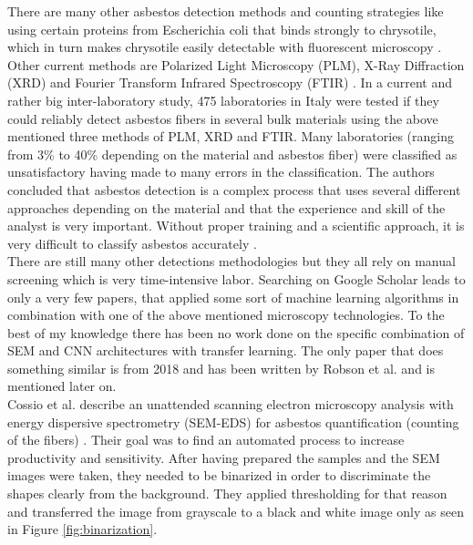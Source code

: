 There are many other asbestos detection methods and counting strategies like using certain proteins from Escherichia coli that binds strongly to chrysotile, which in turn makes chrysotile easily detectable with fluorescent microscopy \cite{kuroda2008detection}. Other current methods are Polarized Light Microscopy (PLM), X-Ray Diffraction (XRD) and Fourier Transform Infrared Spectroscopy (FTIR) \cite{campopiano2018inter}. In a current and rather big inter-laboratory study, 475 laboratories in Italy were tested if they could reliably detect asbestos fibers in several bulk materials using the above mentioned three methods of PLM, XRD and FTIR. Many laboratories (ranging from 3\% to 40\% depending on the material and asbestos fiber) were classified as unsatisfactory having made to many errors in the classification. The authors concluded that asbestos detection is a complex process that uses several different approaches depending on the material and that the experience and skill of the analyst is very important. Without proper training and a scientific approach, it is very difficult to classify asbestos accurately \cite{campopiano2018inter}. \\

There are still many other detections methodologies but they all rely on manual screening which is very time-intensive labor. Searching on Google Scholar leads to only a very few papers, that applied some sort of machine learning algorithms in combination with one of the above mentioned microscopy technologies. To the best of my knowledge there has been no work done on the specific combination of SEM and CNN architectures with transfer learning. The only paper that does something similar is from 2018 and has been written by Robson et al. \cite{robson2018fiac} and is mentioned later on. \\

Cossio et al. describe an unattended scanning electron microscopy analysis with energy dispersive spectrometry (SEM-EDS) for asbestos quantification (counting of the fibers) \cite{cossio2018innovative}. Their goal was to find an automated process to increase productivity and sensitivity. After having prepared the samples and the SEM images were taken, they needed to be binarized in order to discriminate the shapes clearly from the background. They applied thresholding for that reason and transferred the image from grayscale to a black and white image only as seen in Figure \ref{fig:binarization}.

